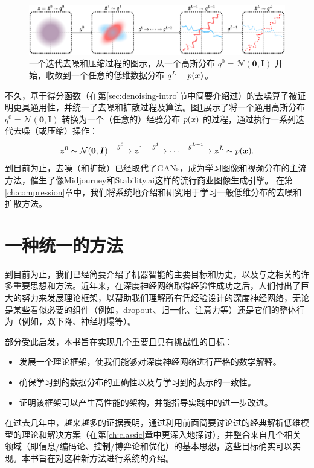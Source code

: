 \documentclass[../../book-main.tex]{subfiles}
\begin{document}
\begin{figure}[t]
    \centering
    \includegraphics[width=\linewidth]{figures/diffusion_pipeline-2.pdf}
    \caption{一个迭代去噪和压缩过程的图示，从一个高斯分布 $q^0 = \mathcal{N}(\boldsymbol{0}, \boldsymbol{I})$ 开始，收敛到一个任意的低维数据分布 $q^L = p(\bm{x})$。}
    \label{fig:diffusion}
\end{figure}

不久，基于得分函数\cite{hyvarinen05a}（在第\ref{sec:denoising-intro}节中简要介绍过）的去噪算子被证明更具通用性，并统一了去噪和扩散过程及算法\cite{song2019,song2020score,ho2020denoising}。图\ref{fig:diffusion}展示了将一个通用高斯分布 $q^0 = \mathcal{N}(\boldsymbol{0}, \boldsymbol{I})$ 转换为一个（任意的）经验分布 $p(\bm{x})$ 的过程，通过执行一系列迭代去噪（或压缩）操作：
\begin{equation}
        \bm{z}^0 \sim  \mathcal{N}(\boldsymbol{0}, \boldsymbol{I})\xrightarrow{\hspace{2mm} g^0  \hspace{2mm}} \bm{z}^1 \xrightarrow{\hspace{2mm} g^1 \hspace{2mm}} \cdots \xrightarrow{\hspace{2mm} g^{L-1}  \hspace{2mm}} \bm{z}^L \sim p(\bm{x}).
\end{equation}
到目前为止，去噪（和扩散）已经取代了GANs，成为学习图像和视频分布的主流方法，催生了像Midjourney和Stability.ai这样的流行商业图像生成引擎。
在第\ref{ch:compression}章中，我们将系统地介绍和研究用于学习一般低维分布的去噪和扩散方法。



\section{一种统一的方法}\label{sec:unifying-approach}
到目前为止，我们已经简要介绍了机器智能的主要目标和历史，以及与之相关的许多重要思想和方法。近年来，在深度神经网络取得经验性成功之后，人们付出了巨大的努力来发展理论框架，以帮助我们理解所有凭经验设计的深度神经网络，无论是某些看似必要的组件（例如，dropout、归一化、注意力等）还是它们的整体行为（例如，双下降、神经坍塌等）。

部分受此启发，本书旨在实现几个重要且具有挑战性的目标：
\begin{itemize}
    \item 发展一个理论框架，使我们能够对深度神经网络进行严格的数学解释。
    \item 确保学习到的数据分布的正确性以及与学习到的表示的一致性。
    \item 证明该框架可以产生高性能的架构，并能指导实践中的进一步改进。
\end{itemize}
在过去几年中，越来越多的证据表明，通过利用前面简要讨论过的经典解析低维模型的理论和解决方案（在第\ref{ch:classic}章中更深入地探讨），并整合来自几个相关领域（即信息/编码论、控制/博弈论和优化）的基本思想，这些目标确实可以实现。本书旨在对这种新方法进行系统的介绍。
\end{document}
